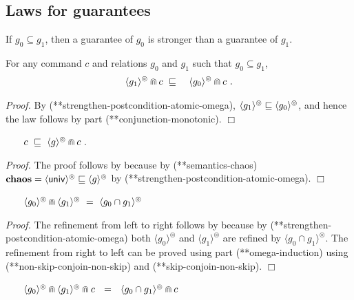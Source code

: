 \documentclass[fleqn]{fac}
\makeatletter
\renewenvironment{proof}{\noindent \textit{Proof.}}{\noindent$\Box$\par}
\def\refproperty{\@ifnextchar*{\@refproperty}{\@@refproperty}}
\def\@refproperty*#1{\ref{property-#1}\index{Property!#1|LawUse}}
\def\@@refproperty#1{property~(\ref{property-#1})\index{Property!#1|LawUse}}
\newcommand{\atomicrel}[1]{\langle#1\rangle}
\newcommand{\omegaskip}{\circledcirc}
\newcommand{\InfSkipIter}{^{\omegaskip}}
\newcommand{\InfGuar}[1]{\atomicrel{#1}\InfSkipIter}
\newcommand{\universalrel}{\mathsf{univ}}
\newcommand{\relint}{\cap}
\newcommand{\relcontained}{\subseteq}
\newcommand{\together}{\mathbin{\doublecap}}
\newcommand{\Keyword}[1]{\mathsf{\mathbf{#1}}}
\newcommand{\Chaos}{\Keyword{chaos}}
\makeatother
\begin{document}
\subsection{Laws for guarantees}\label{section:guarantee-laws}

If $g_0 \relcontained g_1$, then a guarantee of $g_0$ is stronger than a guarantee of $g_1$.
\begin{lawx}
For any command $c$ and relations $g_0$ and $g_1$
such that $g_0 \relcontained g_1$,
\begin{eqnarray*}
  \InfGuar{g_1} \together c & ~\refsto~ & \InfGuar{g_0} \together c~.
\end{eqnarray*}
\end{lawx}

\begin{proof}
By (\refproperty*{strengthen-postcondition-atomic-omega}), 
$\InfGuar{g_1} \refsto \InfGuar{g_0}$,
and hence the law follows by  part (\refproperty*{conjunction-monotonic}).
\end{proof}

\begin{lawx}~~~
\(
  c  ~\refsto~ \InfGuar{g} \together c~.
\)
\end{lawx}
\begin{proof}
The proof follows by  because by (\refproperty*{semantics-chaos})
$\Chaos = \InfGuar{\universalrel} \refsto \InfGuar{g}$ by (\refproperty*{strengthen-postcondition-atomic-omega}).
\end{proof}



\begin{lawx}~~~
\(
  \InfGuar{g_0} \together \InfGuar{g_1} ~=~ \InfGuar{g_0 \relint g_1}
\)
\end{lawx}

\begin{proof}
The refinement from left to right follows 
by  because by (\refproperty*{strengthen-postcondition-atomic-omega})
both $\InfGuar{g_0}$ and $\InfGuar{g_1}$ are refined by $\InfGuar{g_0 \cap g_1}$.
The refinement  from right to left can be proved using  part (\refproperty*{omega-induction})
using (\refproperty*{non-skip-conjoin-non-skip}) and (\refproperty*{skip-conjoin-non-skip}).
\end{proof}

\begin{lawx}~~~
\(
  \InfGuar{g_0} \together \InfGuar{g_1} \together c ~~=~~ \InfGuar{g_0 \relint g_1} \together c
\)
\end{lawx}
\end{document}
